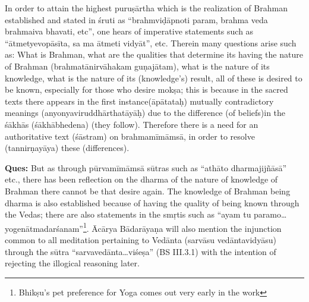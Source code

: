 
In order to attain the highest puruṣārtha which is the realization of Brahman established and stated in śruti as ``brahmviḍāpnoti param, brahma veda brahmaiva bhavati, etc'', one hears of imperative statements such as ``ātmetyevopā\-sīta, sa ma ātmeti vidyāt'', etc. Therein many questions arise such as: What is Brahman, what are the qualities that  determine its having the nature of Brahman (brahmatā\-nirvā\-hakam guṇajātam), what is the nature of its knowledge, what is the nature of its (knowledge's) result, all of these is desired to be known, especially for those who desire mokṣa; this is because in the sacred texts there appears in the first instance(āpātataḥ) mutually contradictory meanings (anyonyaviruddhārthatāyāḥ) due to the difference (of beliefs)in the śākhās (śākhābhedena) (they follow). Therefore there is a need for an authoritative text (śāstram) on brahmamīmāmsā, in order to resolve (tannirṇayāya) these (differences).


       

\textbf{Ques:} But as through pūrvamīmāmsā sūtras such as “athāto dharmajijñāsā” etc., there has been reflection on the dharma of the nature of knowledge of Brahman there cannot be that desire again. The know\-ledge of Brahman being dharma is also established because of having the quality of being known through the Vedas; there are also statements in the smṛtis such as “ayam tu paramo…yogenātmadarśanam”\footnote{Bhikṣu’s pet preference for Yoga comes out very early in the work}. Ācārya Bādarāyaṇa will also mention the injunction common to all meditation pertaining to Vedānta (sarvāsu vedāntavidyāsu) through the sūtra “sarvavedānta…viśeṣa” (BS III.3.1) with the intention of rejecting the illogical reasoning later.

